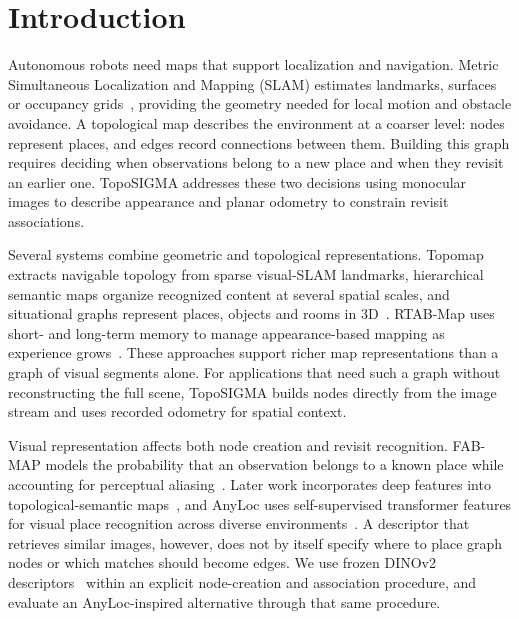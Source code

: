 \documentclass[5p,twocolumn,nonatbib,reversenotenum]{elsarticle}
\newcommand{\methodname}{TopoSIGMA\xspace}
\begin{document}
\section{Introduction}
Autonomous robots need maps that support localization and navigation. Metric Simultaneous Localization and Mapping (SLAM) estimates landmarks, surfaces or occupancy grids~\cite{Cadena2016SLAM}, providing the geometry needed for local motion and obstacle avoidance. A topological map describes the environment at a coarser level: nodes represent places, and edges record connections between them. Building this graph requires deciding when observations belong to a new place and when they revisit an earlier one. \methodname addresses these two decisions using monocular images to describe appearance and planar odometry to constrain revisit associations.

Several systems combine geometric and topological representations. Topomap extracts navigable topology from sparse visual-SLAM landmarks, hierarchical semantic maps organize recognized content at several spatial scales, and situational graphs represent places, objects and rooms in 3D~\cite{Blochliger2018,Luo2018,Bavle2022}. RTAB-Map uses short- and long-term memory to manage appearance-based mapping as experience grows~\cite{Labbe2019RTABMap}. These approaches support richer map representations than a graph of visual segments alone. For applications that need such a graph without reconstructing the full scene, \methodname builds nodes directly from the image stream and uses recorded odometry for spatial context.

Visual representation affects both node creation and revisit recognition. FAB-MAP models the probability that an observation belongs to a known place while accounting for perceptual aliasing~\cite{Cummins2008FABMAP}. Later work incorporates deep features into topological-semantic maps~\cite{Sousa2022}, and AnyLoc uses self-supervised transformer features for visual place recognition across diverse environments~\cite{Keetha2023AnyLoc}. A descriptor that retrieves similar images, however, does not by itself specify where to place graph nodes or which matches should become edges. We use frozen DINOv2 descriptors~\cite{oquab2024dinov2learningrobustvisual} within an explicit node-creation and association procedure, and evaluate an AnyLoc-inspired alternative through that same procedure.
\end{document}
